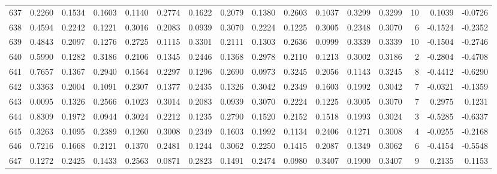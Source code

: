 \begin{tabular}{lrrrrrrrrrrrrrrr}
637 &      0.2260 &  0.1534 &  0.1603 &  0.1140 &  0.2774 &  0.1622 &  0.2079 &  0.1380 &  0.2603 &  0.1037 &   0.3299 &     0.3299 &     10 &                    0.1039 &                    -0.0726 \\
638 &      0.4594 &  0.2242 &  0.1221 &  0.3016 &  0.2083 &  0.0939 &  0.3070 &  0.2224 &  0.1225 &  0.3005 &   0.2348 &     0.3070 &      6 &                   -0.1524 &                    -0.2352 \\
639 &      0.4843 &  0.2097 &  0.1276 &  0.2725 &  0.1115 &  0.3301 &  0.2111 &  0.1303 &  0.2636 &  0.0999 &   0.3339 &     0.3339 &     10 &                   -0.1504 &                    -0.2746 \\
640 &      0.5990 &  0.1282 &  0.3186 &  0.2106 &  0.1345 &  0.2446 &  0.1368 &  0.2978 &  0.2110 &  0.1213 &   0.3002 &     0.3186 &      2 &                   -0.2804 &                    -0.4708 \\
641 &      0.7657 &  0.1367 &  0.2940 &  0.1564 &  0.2297 &  0.1296 &  0.2690 &  0.0973 &  0.3245 &  0.2056 &   0.1143 &     0.3245 &      8 &                   -0.4412 &                    -0.6290 \\
642 &      0.3363 &  0.2004 &  0.1091 &  0.2307 &  0.1377 &  0.2435 &  0.1326 &  0.3042 &  0.2349 &  0.1603 &   0.1992 &     0.3042 &      7 &                   -0.0321 &                    -0.1359 \\
643 &      0.0095 &  0.1326 &  0.2566 &  0.1023 &  0.3014 &  0.2083 &  0.0939 &  0.3070 &  0.2224 &  0.1225 &   0.3005 &     0.3070 &      7 &                    0.2975 &                     0.1231 \\
644 &      0.8309 &  0.1972 &  0.0944 &  0.3024 &  0.2212 &  0.1235 &  0.2790 &  0.1520 &  0.2152 &  0.1518 &   0.1993 &     0.3024 &      3 &                   -0.5285 &                    -0.6337 \\
645 &      0.3263 &  0.1095 &  0.2389 &  0.1260 &  0.3008 &  0.2349 &  0.1603 &  0.1992 &  0.1134 &  0.2406 &   0.1271 &     0.3008 &      4 &                   -0.0255 &                    -0.2168 \\
646 &      0.7216 &  0.1668 &  0.2121 &  0.1370 &  0.2481 &  0.1244 &  0.3062 &  0.2250 &  0.1415 &  0.2087 &   0.1349 &     0.3062 &      6 &                   -0.4154 &                    -0.5548 \\
647 &      0.1272 &  0.2425 &  0.1433 &  0.2563 &  0.0871 &  0.2823 &  0.1491 &  0.2474 &  0.0980 &  0.3407 &   0.1900 &     0.3407 &      9 &                    0.2135 &                     0.1153 \\

\end{tabular}
